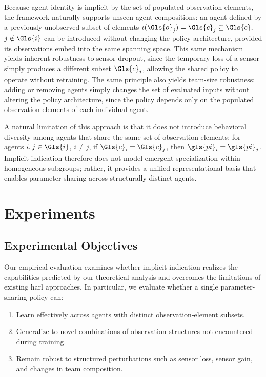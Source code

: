 Because agent identity is implicit by the set of populated observation elements, 
the framework naturally supports unseen agent compositions: 
an agent defined by a previously unobserved subset of elements 
\(\iota(\Gls{o}_j) = \Gls{c}_j \subseteq \Gls{c},\) \(j \notin \Gls{i}\)
can be introduced without changing the policy architecture, 
provided its observations embed into the same spanning space. 
This same mechanism yields inherent robustness to sensor dropout, 
since the temporary loss of a sensor simply produces a 
different subset \(\Gls{c}_j\), %
allowing the shared policy to operate without retraining.
The same principle also yields team-size robustness: 
adding or removing agents simply changes the set of evaluated inputs 
without altering the policy architecture, since the policy depends 
only on the populated observation elements of each individual agent.

A natural limitation of this approach is that it does not introduce behavioral 
diversity among agents that share the same set of observation elements: 
for agents \(i,j \in \Gls{i}\), \(i\neq j\), 
if \(\Gls{c}_i = \Gls{c}_j\), then \(\gls{pi}_i = \gls{pi}_j\).
Implicit indication therefore does not model emergent specialization 
within homogeneous subgroups; rather, it provides a unified representational 
basis that enables parameter sharing across structurally distinct agents.

\section{Experiments}
\label{con2:sec:experiments}

\subsection{Experimental Objectives}

Our empirical evaluation examines whether implicit indication 
realizes the capabilities predicted by our theoretical analysis 
and overcomes the limitations of existing \gls{harl} approaches. 
In particular, we evaluate whether a single parameter-sharing policy can:
\begin{enumerate}
    \item Learn effectively across agents with distinct observation-element subsets.
    \item Generalize to novel combinations of observation structures not encountered during training.
    \item Remain robust to structured perturbations such as sensor loss, sensor gain,
          and changes in team composition.
\end{enumerate}

